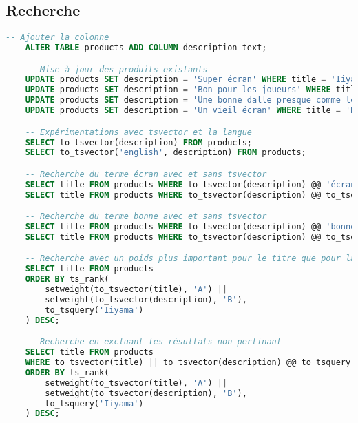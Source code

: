 \documentclass[a4paper,10pt]{article}
\begin{document}
  \subsection{Recherche}
    \begin{lstlisting}[language=SQL, basicstyle=\ttfamily, gobble=4, tabsize=2, showstringspaces=false]
    -- Ajouter la colonne
    ALTER TABLE products ADD COLUMN description text;

    -- Mise à jour des produits existants
    UPDATE products SET description = 'Super écran' WHERE title = 'Iiyama';
    UPDATE products SET description = 'Bon pour les joueurs' WHERE title = 'Acer';
    UPDATE products SET description = 'Une bonne dalle presque comme le Iiyama' WHERE title = 'HP';
    UPDATE products SET description = 'Un vieil écran' WHERE title = 'Dell';

    -- Expérimentations avec tsvector et la langue
    SELECT to_tsvector(description) FROM products;
    SELECT to_tsvector('english', description) FROM products;

    -- Recherche du terme écran avec et sans tsvector
    SELECT title FROM products WHERE to_tsvector(description) @@ 'écran';
    SELECT title FROM products WHERE to_tsvector(description) @@ to_tsquery('écran');

    -- Recherche du terme bonne avec et sans tsvector
    SELECT title FROM products WHERE to_tsvector(description) @@ 'bonne';
    SELECT title FROM products WHERE to_tsvector(description) @@ to_tsquery('bonne');

    -- Recherche avec un poids plus important pour le titre que pour la description
    SELECT title FROM products
    ORDER BY ts_rank(
        setweight(to_tsvector(title), 'A') ||
        setweight(to_tsvector(description), 'B'),
        to_tsquery('Iiyama')
    ) DESC;

    -- Recherche en excluant les résultats non pertinant
    SELECT title FROM products
    WHERE to_tsvector(title) || to_tsvector(description) @@ to_tsquery('Iiyama')
    ORDER BY ts_rank(
        setweight(to_tsvector(title), 'A') ||
        setweight(to_tsvector(description), 'B'),
        to_tsquery('Iiyama')
    ) DESC;
    \end{lstlisting}
\end{document}
